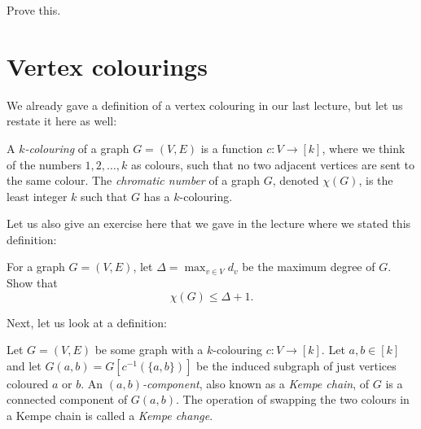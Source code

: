 \documentclass[nobib]{tufte-handout}
\begin{document}
\begin{xca}
  Prove this.
\end{xca}

\section{Vertex colourings}

We already gave a definition of a vertex colouring in our last lecture, but let us restate it here as well:

\begin{definition}
  A \emph{$k$-colouring} of a graph $G = (V,E)$ is a function $c: V \to [k]$, where we think of the numbers $1,2,\ldots,k$ as colours, such that no two adjacent vertices are sent to the same colour. The \emph{chromatic number} of a graph $G$, denoted $\chi(G)$, is the least integer $k$ such that $G$ has a $k$-colouring.
\end{definition}

Let us also give an exercise here that we gave in the lecture where we stated this definition:

\begin{xca}
  For a graph $G = (V,E)$, let $\Delta = \max_{v \in V} d_v$ be the maximum degree of $G$. Show that
  $$\chi(G) \leq \Delta + 1.$$
\end{xca}

Next, let us look at a definition:

\begin{definition}
  Let $G = (V,E)$ be some graph with a $k$-colouring $c: V \to [k]$. Let $a, b \in [k]$ and let $G(a,b) = G[c^{-1}(\{a,b\})]$ be the induced subgraph of just vertices coloured $a$ or $b$. An \emph{$(a,b)$-component}, also known as a \emph{Kempe chain}, of $G$ is a connected component of $G(a,b)$. The operation of swapping the two colours in a Kempe chain is called a \emph{Kempe change}.
\end{definition}
\end{document}

